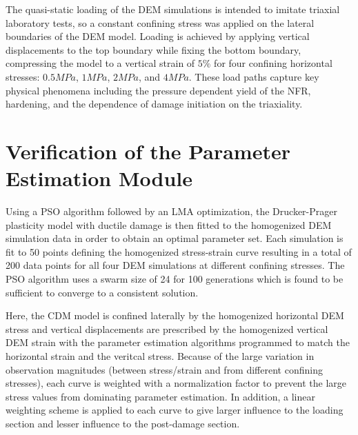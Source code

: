 The quasi-static loading of the DEM simulations is intended to imitate triaxial laboratory tests, so a constant confining stress was applied on the lateral boundaries of the DEM model. Loading is achieved by applying vertical displacements to the top boundary while fixing the bottom boundary, compressing the model to a vertical strain of $5\%$ for four confining horizontal stresses: $0.5MPa$, $1MPa$, $2MPa$, and $4MPa$. These load paths capture key physical phenomena including the pressure dependent yield of the NFR, hardening, and the dependence of damage initiation on the triaxiality. 


\section{Verification of the Parameter Estimation Module}

Using a PSO algorithm followed by an LMA optimization, the Drucker-Prager plasticity model with ductile damage is then fitted to the homogenized DEM simulation data in order to obtain an optimal parameter set. Each simulation is fit to 50 points defining the homogenized stress-strain curve resulting in a total of 200 data points for all four DEM simulations at different confining stresses. The PSO algorithm uses a swarm size of 24 for 100 generations which is found to be sufficient to converge to a consistent solution. 

Here, the CDM model is confined laterally by the homogenized horizontal DEM stress and vertical displacements are prescribed by the homogenized vertical DEM strain with the parameter estimation algorithms programmed to match the horizontal strain and the veritcal stress. Because of the large variation in observation magnitudes (between stress/strain and from different confining stresses), each curve is weighted with a normalization factor to prevent the large stress values from dominating parameter estimation. In addition, a linear weighting scheme is applied to each curve to give larger influence to the loading section and lesser influence to the post-damage section.


